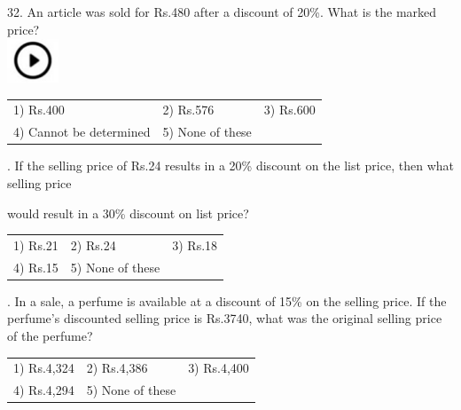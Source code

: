 \documentclass{article}
\begin{document}
	\noindent 
	
	32. An article was sold for Rs.480 after a discount of 20\%. What is the marked price? \noindent \\ \includegraphics*[width=0.60in, height=0.52in]{images/image1}  
	\begin{tabular}{p{1.7in} p{1.6in} p{1.6in}} \\ 
 1) Rs.400                                                        & 2) Rs.576                                    & 3) Rs.600
	
	\noindent 
	
	\noindent \\
4) Cannot be determined                            & 5) None of these  \\
\end{tabular}
	
	\noindent 
	
	\noindent 
	
	. If the selling price of Rs.24 results in a 20\% discount on the list price, then what selling price
	
	\noindent 
	
	\noindent would result in a 30\% discount on list price?
	
	\noindent 
	
	\noindent  
	\begin{tabular}{p{1.7in} p{1.6in} p{1.6in}} \\ 
 1) Rs.21                   & 2) Rs.24                         & 3) Rs.18                         \\
4) Rs.15                         & 5) None of these  \\
\end{tabular}
	
	\noindent 
	
	\noindent 
	
	. In a sale, a perfume is available at a discount of 15\% on the selling price. If the perfume's discounted selling price is Rs.3740, what was the original selling price of the perfume?
	
	\noindent  
	\begin{tabular}{p{1.7in} p{1.6in} p{1.6in}} \\ 
 1) Rs.4,324              & 2) Rs.4,386       & 3) Rs.4,400       \\
4) Rs.4,294       & 5) None of these  \\
\end{tabular}
	
\end{document}
